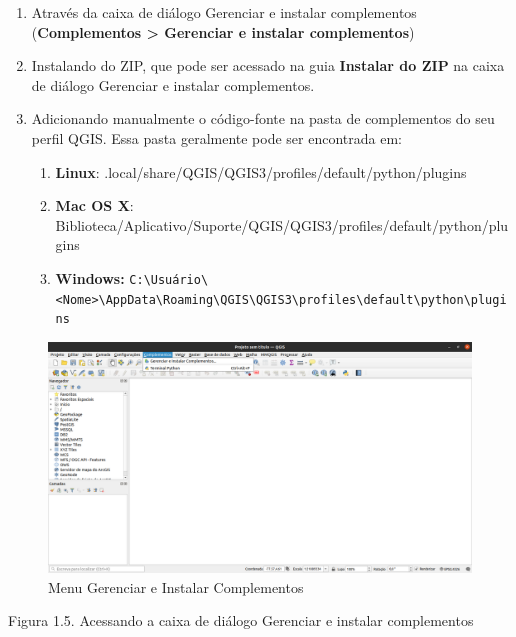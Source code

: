 \documentclass[
  portuguese,
]{krantz}
\providecommand{\tightlist}{%
  \setlength{\itemsep}{0pt}\setlength{\parskip}{0pt}}
\begin{document}
\begin{enumerate}
\def\labelenumi{\arabic{enumi}.}
\tightlist
\item
  Através da caixa de diálogo Gerenciar e instalar complementos (\textbf{Complementos \textgreater{} Gerenciar e instalar complementos})
\item
  Instalando do ZIP, que pode ser acessado na guia \textbf{Instalar do ZIP} na caixa de diálogo Gerenciar e instalar complementos.
\item
  Adicionando manualmente o código-fonte na pasta de complementos do seu perfil QGIS. Essa pasta geralmente pode ser encontrada em:

  \begin{enumerate}
  \def\labelenumii{\arabic{enumii}.}
  \tightlist
  \item
    \textbf{Linux}: .local/share/QGIS/QGIS3/profiles/default/python/plugins
  \item
    \textbf{Mac OS X}: Biblioteca/Aplicativo/Suporte/QGIS/QGIS3/profiles/default/python/plugins
  \item
    \textbf{Windows:} \texttt{C:\textbackslash{}Usuário\textbackslash{}\textless{}Nome\textgreater{}\textbackslash{}AppData\textbackslash{}Roaming\textbackslash{}QGIS\textbackslash{}QGIS3\textbackslash{}profiles\textbackslash{}default\textbackslash{}python\textbackslash{}plugins}
  \end{enumerate}
\end{enumerate}

\begin{figure}
\centering
\includegraphics{media/modulo1/plugins-menu.png}
\caption{Menu Gerenciar e Instalar Complementos}
\end{figure}

Figura 1.5. Acessando a caixa de diálogo Gerenciar e instalar complementos
\end{document}
